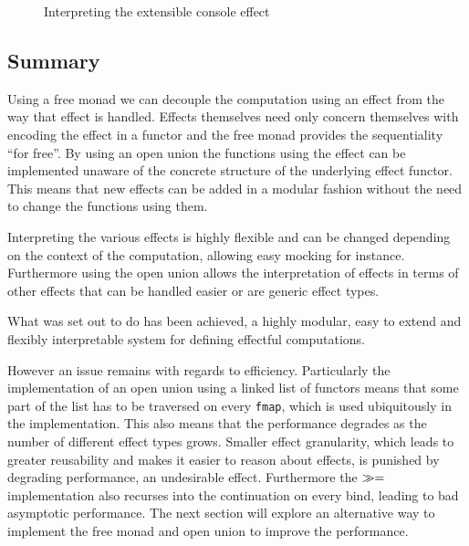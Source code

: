 \begin{figure}
  
  \caption{Interpreting the extensible console effect}
  \label{fig:run-console}
\end{figure}

\subsection{Summary}

Using a free monad we can decouple the computation using an effect from the way
that effect is handled. Effects themselves need only concern themselves with
encoding the effect in a functor and the free monad provides the sequentiality
``for free''. By using an open union the functions using the effect can be
implemented unaware of the concrete structure of the underlying effect functor.
This means that new effects can be added in a modular fashion without the need
to change the functions using them.

Interpreting the various effects is highly flexible and can be changed depending
on the context of the computation, allowing easy mocking for instance.
Furthermore using the open union allows the interpretation of effects in terms
of other effects that can be handled easier or are generic effect types.

What was set out to do has been achieved, a highly modular, easy to extend and
flexibly interpretable system for defining effectful computations.

However an issue remains with regards to efficiency. Particularly the
implementation of an open union using a linked list of functors means that some
part of the list has to be traversed on every \texttt{fmap}, which is used
ubiquitously in the implementation. This also means that the performance
degrades as the number of different effect types grows. Smaller effect
granularity, which leads to greater reusability and makes it easier to reason
about effects, is punished by degrading performance, an undesirable effect.
Furthermore the $\gg={}$ implementation also recurses into the continuation on
every bind, leading to bad asymptotic performance. The next section will explore
an alternative way to implement the free monad and open union to improve the
performance.
